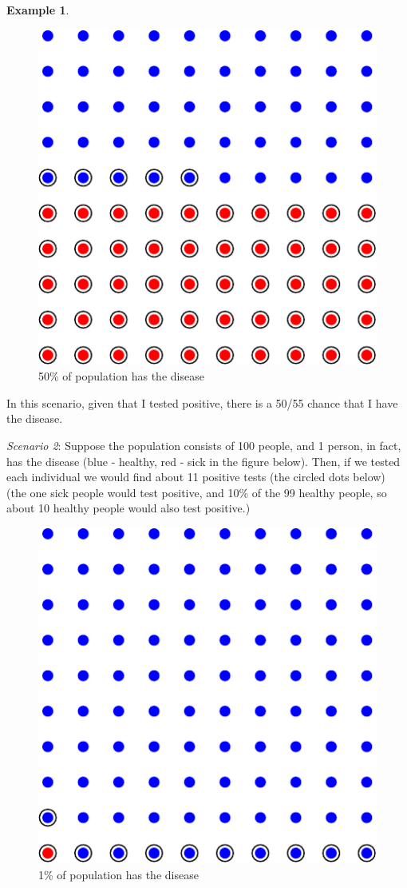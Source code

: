 \documentclass[
]{book}
\theoremstyle{definition}
\theoremstyle{definition}
\newtheorem{example}{Example}[chapter]
\theoremstyle{definition}
\theoremstyle{definition}
\theoremstyle{remark}
\begin{document}
\begin{example}
\begin{figure}
\centering
\includegraphics{math340-notes_files/figure-latex/50-50-sick-1.pdf}
\caption{\label{fig:50-50-sick}50\% of population has the disease}
\end{figure}

In this scenario, given that I tested positive, there is a 50/55 chance that I have the disease.

\emph{Scenario 2}: Suppose the population consists of 100 people, and 1 person, in fact, has the disease (blue - healthy, red - sick in the figure below). Then, if we tested each individual we would find about 11 positive tests (the circled dots below) (the one sick people would test positive, and 10\% of the 99 healthy people, so about 10 healthy people would also test positive.)

\begin{figure}
\centering
\includegraphics{math340-notes_files/figure-latex/1-99-sick-1.pdf}
\caption{\label{fig:1-99-sick}1\% of population has the disease}
\end{figure}


\end{example}
\end{document}

